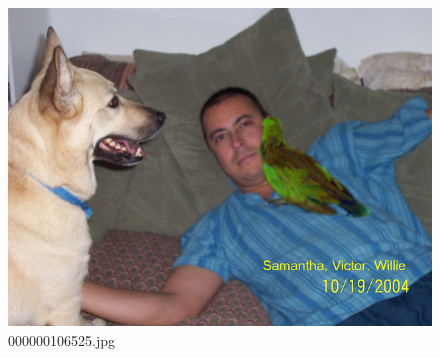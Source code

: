     \begin{figure}[h]
        \centering
        \includegraphics[width=0.8\linewidth]{../image set/easy/000000106525.jpg}
        \caption{000000106525.jpg}
    \end{figure}
